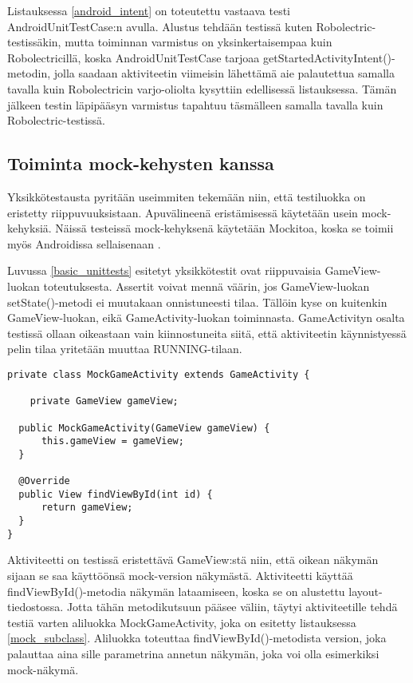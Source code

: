 Listauksessa \ref{android_intent} on toteutettu vastaava testi AndroidUnitTestCase:n avulla. Alustus tehdään testissä kuten Robolectric-testissäkin, mutta toiminnan varmistus on yksinkertaisempaa kuin Robolectricillä, koska AndroidUnitTestCase tarjoaa getStartedActivityIntent()-metodin, jolla saadaan aktiviteetin viimeisin lähettämä aie palautettua samalla tavalla kuin Robolectricin varjo-oliolta kysyttiin edellisessä listauksessa. Tämän jälkeen testin läpipääsyn varmistus tapahtuu täsmälleen samalla tavalla kuin Robolectric-testissä.

\subsection{Toiminta mock-kehysten kanssa}

Yksikkötestausta pyritään useimmiten tekemään niin, että testiluokka on eristetty riippuvuuksistaan. Apuvälineenä eristämisessä käytetään usein mock-kehyksiä. Näissä testeissä mock-kehyksenä käytetään Mockitoa, koska se toimii myös Androidissa sellaisenaan \cite{mockito}.

Luvussa \ref{basic_unittests} esitetyt yksikkötestit ovat riippuvaisia GameView-luokan toteutuksesta. Assertit voivat mennä väärin, jos GameView-luokan setState()-metodi ei muutakaan onnistuneesti tilaa. Tällöin kyse on kuitenkin GameView-luokan, eikä GameActivity-luokan toiminnasta. GameActivityn osalta testissä ollaan oikeastaan vain kiinnostuneita siitä, että aktiviteetin käynnistyessä pelin tilaa yritetään muuttaa RUNNING-tilaan.

\begin{lstlisting}[float,label=mock_subclass, caption=Mock Subclass]
private class MockGameActivity extends GameActivity {
	
	private GameView gameView;

  public MockGameActivity(GameView gameView) {
	  this.gameView = gameView;
  }

  @Override
  public View findViewById(int id) {
	  return gameView;
  }
}
\end{lstlisting}

Aktiviteetti on testissä eristettävä GameView:stä niin, että oikean näkymän sijaan se saa käyttöönsä mock-version näkymästä. Aktiviteetti käyttää findViewById()-metodia näkymän lataamiseen, koska se on alustettu layout-tiedostossa. Jotta tähän metodikutsuun pääsee väliin, täytyi aktiviteetille tehdä testiä varten aliluokka MockGameActivity, joka on esitetty listauksessa \ref{mock_subclass}. Aliluokka toteuttaa findViewById()-metodista version, joka palauttaa aina sille parametrina annetun näkymän, joka voi olla esimerkiksi mock-näkymä.

